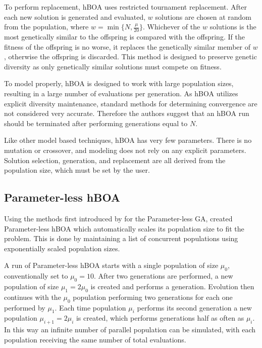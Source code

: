 \documentclass[twoside]{article}
\begin{document}
To perform replacement, hBOA uses restricted tournament replacement. After each new solution is generated
and evaluated, $w$ solutions are chosen at random from the population, where $w=\min\{N, \frac{\mu}{20}\}$.
Whichever of the $w$ solutions is the most genetically similar to the offspring is compared with the offspring.
If the fitness of the offspring is no worse, it replaces the genetically similar member of $w$, otherwise the
offspring is discarded. This method is designed to preserve genetic diversity as only genetically similar
solutions must compete on fitness.

To model properly, hBOA is designed to work with large population sizes, resulting in a large number of
evaluations per generation. As hBOA utilizes explicit diversity maintenance, standard methods for determining
convergence are not considered very accurate. Therefore the authors suggest that an hBOA run should be
terminated after performing generations equal to $N$.

Like other model based techniques, hBOA has very few parameters. There is no mutation or crossover,
and modeling does not rely on any explicit parameters. Solution selection, generation, and replacement
are all derived from the population size, which must be set by the user.

\subsection{Parameter-less hBOA}
Using the methods first introduced by \cite{harik:1999:parameterlessga} for the Parameter-less GA,
\cite{pelikan:2004:parameterlesshboa} created Parameter-less hBOA which automatically scales its
population size to fit the problem. This is done by maintaining a list of concurrent populations
using exponentially scaled population sizes.

A run of Parameter-less hBOA starts with a single population of size $\mu_0$, conventionally set
to $\mu_0=10$. After two generations are performed, a new population of size $\mu_1 = 2\mu_0$ is created
and performs a generation. Evolution then continues with the $\mu_0$ population performing two generations
for each one performed by $\mu_1$. Each time population $\mu_i$ performs its second generation a new population
$\mu_{i+1}=2\mu_i$ is created, which performs generations half as often as $\mu_i$. In this way an infinite number of
parallel population can be simulated, with each population receiving the same number of total evaluations.
\end{document}
